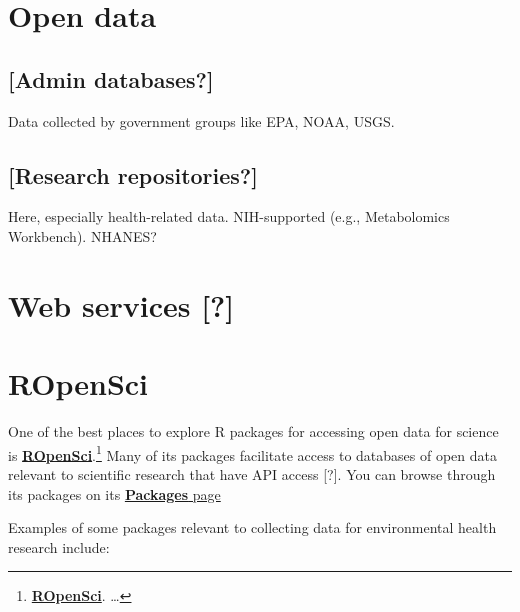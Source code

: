 \documentclass[]{tufte-book}
\begin{document}
\hypertarget{open-data}{%
\section{Open data}\label{open-data}}

\hypertarget{admin-databases}{%
\subsection{{[}Admin databases?{]}}\label{admin-databases}}

Data collected by government groups like EPA, NOAA, USGS.

\hypertarget{research-repositories}{%
\subsection{{[}Research repositories?{]}}\label{research-repositories}}

Here, especially health-related data.
NIH-supported (e.g., Metabolomics Workbench).
NHANES?

\hypertarget{web-services}{%
\section{Web services {[}?{]}}\label{web-services}}

\hypertarget{ropensci}{%
\section{ROpenSci}\label{ropensci}}

One of the best places to explore R packages for accessing open data for science is
\href{https://ropensci.org/}{\textbf{ROpenSci}}.\footnote{\href{https://ropensci.org/}{\textbf{ROpenSci}}. \ldots{}}
Many of its packages facilitate access to databases of open data relevant to scientific
research that have API access {[}?{]}. You can browse through its packages on
its \href{https://ropensci.org/packages/}{\textbf{Packages} page}

Examples of some packages relevant to collecting data for environmental health research
include:
\end{document}
